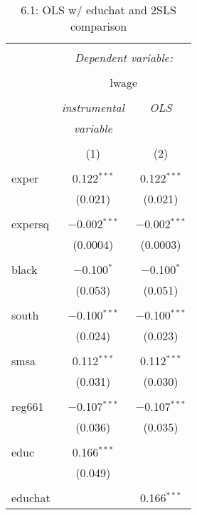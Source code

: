 \documentclass[11pt]{article} %
\begin{document}
\begin{table}[!htbp] \centering 
    \caption{6.1: OLS w/ educhat and 2SLS comparison} 
    \label{} 
  \begin{tabular}{@{\extracolsep{5pt}}lcc} 
  \\[-1.8ex]\hline 
  \hline \\[-1.8ex] 
   & \multicolumn{2}{c}{\textit{Dependent variable:}} \\ 
  \cline{2-3} 
  \\[-1.8ex] & \multicolumn{2}{c}{lwage} \\ 
  \\[-1.8ex] & \textit{instrumental} & \textit{OLS} \\ 
   & \textit{variable} & \textit{} \\ 
  \\[-1.8ex] & (1) & (2)\\ 
  \hline \\[-1.8ex] 
   exper & 0.122$^{***}$ & 0.122$^{***}$ \\ 
    & (0.021) & (0.021) \\ 
    & & \\ 
   expersq & $-$0.002$^{***}$ & $-$0.002$^{***}$ \\ 
    & (0.0004) & (0.0003) \\ 
    & & \\ 
   black & $-$0.100$^{*}$ & $-$0.100$^{*}$ \\ 
    & (0.053) & (0.051) \\ 
    & & \\ 
   south & $-$0.100$^{***}$ & $-$0.100$^{***}$ \\ 
    & (0.024) & (0.023) \\ 
    & & \\ 
   smsa & 0.112$^{***}$ & 0.112$^{***}$ \\ 
    & (0.031) & (0.030) \\ 
    & & \\ 
   reg661 & $-$0.107$^{***}$ & $-$0.107$^{***}$ \\ 
    & (0.036) & (0.035) \\ 
    & & \\ 
   educ & 0.166$^{***}$ &  \\ 
    & (0.049) &  \\ 
    & & \\ 
   educhat &  & 0.166$^{***}$ \\ 

\end{tabular}
\end{table}
\end{document}
